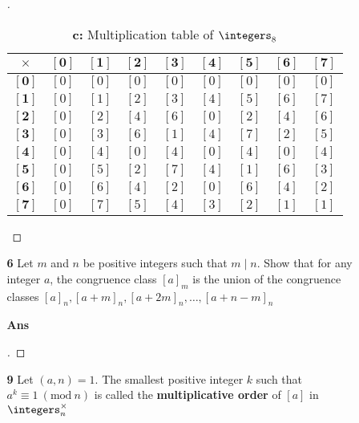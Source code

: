 \documentclass[paper=usletter, fontsize=12pt]{article}
\newcommand{\Mod}[1]{\ (\mathrm{mod}\ #1)}
\begin{document}
\begin{itemize}
\begin{itemize}
\begin{proof}[\unskip\nopunct]
                \begin{table}
                    \centering
                    \caption{\textbf{c:} Multiplication table of $\integers_8$}
                    \renewcommand{\arraystretch}{2.5}
                    \begin{tabular}{|c|c|c|c|c|c|c|c|c|}
\hline
$\bm{\times}$ & $\bm{[0]}$ & $\bm{[1]}$ & $\bm{[2]}$ & $\bm{[3]}$ & $\bm{[4]}$ & $\bm{[5]}$ & $\bm{[6]}$ & $\bm{[7]}$ \\
\hline
$\bm{[0]}$ & $[0]$ & $[0]$ & $[0]$ & $[0]$ & $[0]$ & $[0]$ & $[0]$ & $[0]$ \\
\hline
$\bm{[1]}$ & $[0]$ & $[1]$ & $[2]$ & $[3]$ & $[4]$ & $[5]$ & $[6]$ & $[7]$ \\
\hline
$\bm{[2]}$ & $[0]$ & $[2]$ & $[4]$ & $[6]$ & $[0]$ & $[2]$ & $[4]$ & $[6]$ \\
\hline
$\bm{[3]}$ & $[0]$ & $[3]$ & $[6]$ & $[1]$ & $[4]$ & $[7]$ & $[2]$ & $[5]$ \\
\hline
$\bm{[4]}$ & $[0]$ & $[4]$ & $[0]$ & $[4]$ & $[0]$ & $[4]$ & $[0]$ & $[4]$ \\
\hline
$\bm{[5]}$ & $[0]$ & $[5]$ & $[2]$ & $[7]$ & $[4]$ & $[1]$ & $[6]$ & $[3]$ \\
\hline
$\bm{[6]}$ & $[0]$ & $[6]$ & $[4]$ & $[2]$ & $[0]$ & $[6]$ & $[4]$ & $[2]$ \\
\hline
$\bm{[7]}$ & $[0]$ & $[7]$ & $[5]$ & $[4]$ & $[3]$ & $[2]$ & $[1]$ & $[1]$ \\
\hline
                    \end{tabular}
                \end{table}

            \end{proof}
            \newpage

            \item[\textbf{6}] Let $m$ and $n$ be positive integers such that
            $m\mid n$. Show that for any integer $a$, the congruence class
            $[a]_m$ is the union of the congruence classes $[a]_n, [a+m]_n, [a+2m]_n, \ldots, [a+n-m]_n$
            \item[\textbf{Ans}]
            \begin{proof}[\unskip\nopunct]
            \end{proof}
            \vspace{0.2in}

            \item[\textbf{9}] Let $(a, n)=1$. The smallest positive integer $k$
            such that $a^k \equiv 1 \Mod{n}$ is called the
            \textbf{multiplicative order} of $[a]$ in $\integers_n^\times$
            \begin{itemize}


\end{itemize}
\end{itemize}
\end{itemize}
\end{document}

